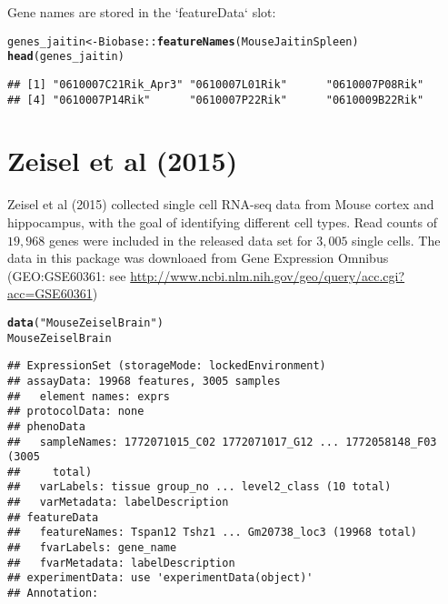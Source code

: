 \documentclass[12pt]{article}\usepackage[]{graphicx}\usepackage[usenames,dvipsnames]{color}
\makeatletter
\newcommand{\hlstr}[1]{\textcolor[rgb]{0.192,0.494,0.8}{#1}}%
\newcommand{\hlopt}[1]{\textcolor[rgb]{0,0,0}{#1}}%
\newcommand{\hlstd}[1]{\textcolor[rgb]{0.345,0.345,0.345}{#1}}%
\newcommand{\hlkwb}[1]{\textcolor[rgb]{0.69,0.353,0.396}{#1}}%
\newcommand{\hlkwd}[1]{\textcolor[rgb]{0.737,0.353,0.396}{\textbf{#1}}}%
\newenvironment{kframe}{%
 \def\at@end@of@kframe{}%
 \ifinner\ifhmode%
  \def\at@end@of@kframe{\end{minipage}}%
  \begin{minipage}{\columnwidth}%
 \fi\fi%
 \def\FrameCommand##1{\hskip\@totalleftmargin \hskip-\fboxsep
 \colorbox{shadecolor}{##1}\hskip-\fboxsep
     \hskip-\linewidth \hskip-\@totalleftmargin \hskip\columnwidth}%
 \MakeFramed {\advance\hsize-\width
   \@totalleftmargin\z@ \linewidth\hsize
   \@setminipage}}%
 {\par\unskip\endMakeFramed%
 \at@end@of@kframe}
\newenvironment{knitrout}{}{} %
\makeatother
\begin{document}
Gene names are stored in the `featureData` slot:

\begin{knitrout}
\color{fgcolor}\begin{kframe}
\begin{alltt}
\hlstd{genes_jaitin} \hlkwb{<-} \hlstd{Biobase}\hlopt{::}\hlkwd{featureNames}\hlstd{(MouseJaitinSpleen)}
\hlkwd{head}\hlstd{(genes_jaitin)}
\end{alltt}
\begin{verbatim}
## [1] "0610007C21Rik_Apr3" "0610007L01Rik"      "0610007P08Rik"     
## [4] "0610007P14Rik"      "0610007P22Rik"      "0610009B22Rik"
\end{verbatim}
\end{kframe}
\end{knitrout}


\section{Zeisel et al (2015)}

Zeisel et al (2015) \cite{Zeisel2015} collected single cell RNA-seq data from Mouse
cortex and hippocampus, with the goal of identifying different cell types. Read counts of $19,968$ genes were included in the released data set for $3,005$ single cells. The data in this package was downloaed from Gene Expression Omnibus (GEO:GSE60361: see
\url{http://www.ncbi.nlm.nih.gov/geo/query/acc.cgi?acc=GSE60361})


\begin{knitrout}
\color{fgcolor}\begin{kframe}
\begin{alltt}
\hlkwd{data}\hlstd{(}\hlstr{"MouseZeiselBrain"}\hlstd{)}
\hlstd{MouseZeiselBrain}
\end{alltt}
\begin{verbatim}
## ExpressionSet (storageMode: lockedEnvironment)
## assayData: 19968 features, 3005 samples 
##   element names: exprs 
## protocolData: none
## phenoData
##   sampleNames: 1772071015_C02 1772071017_G12 ... 1772058148_F03 (3005
##     total)
##   varLabels: tissue group_no ... level2_class (10 total)
##   varMetadata: labelDescription
## featureData
##   featureNames: Tspan12 Tshz1 ... Gm20738_loc3 (19968 total)
##   fvarLabels: gene_name
##   fvarMetadata: labelDescription
## experimentData: use 'experimentData(object)'
## Annotation:
\end{verbatim}
\end{kframe}
\end{knitrout}
\end{document}
